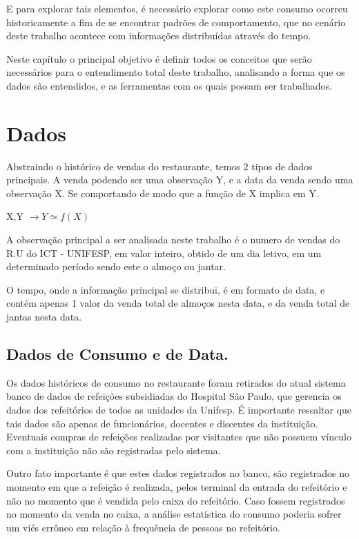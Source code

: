 \documentclass[	12pt, Times, openright, twoside, a4paper, english, brazil]{abntex2}
\begin{document}
        E para explorar tais elementos, é necessário explorar como este consumo ocorreu historicamente a fim de se encontrar padrões de comportamento, que no cenário deste trabalho acontece com informações distribuídas através do tempo. 

        Neste capítulo o principal objetivo é definir todos os conceitos que serão necessários para o entendimento total deste trabalho, analisando a forma que os dados são entendidos, e as ferramentas com os quais possam ser trabalhados.

      \section{Dados}
        Abstraindo o histórico de vendas do restaurante, temos 2 tipos de dados principais. A venda podendo ser uma observação Y, e a data da venda sendo uma observação X. Se comportando de modo que a função de X implica em Y. 

        X,Y $\rightarrow Y \simeq f(X) $

        A observação principal a ser analisada neste trabalho é o numero de vendas do R.U do ICT - UNIFESP, em valor inteiro, obtido de um dia letivo, em um determinado período sendo este o almoço ou jantar.

        O tempo, onde a informação principal se distribui, é em formato de data, e contém apenas 1 valor da venda total de almoços nesta data, e da venda total de jantas nesta data.

        \subsection{Dados de Consumo e de Data.}
          Os dados históricos de consumo no restaurante foram retirados do atual sistema banco de dados de refeições subsidiadas do Hospital São Paulo, que gerencia os dados dos refeitórios de todos as unidades da Unifesp. É importante ressaltar que tais dados são apenas de funcionários, docentes e discentes da instituição. Eventuais compras de refeições realizadas por visitantes que não possuem vínculo com a instituição não são registradas pelo sistema. 

          Outro fato importante é que estes dados registrados no banco, são registrados no momento em que a refeição é realizada, pelos terminal da entrada do refeitório e não no momento que é vendida pelo caixa do refeitório. Caso fossem registrados no momento da venda no caixa, a análise estatística do consumo poderia sofrer um viés errôneo em relação à frequência de pessoas no refeitório. 
\end{document}
